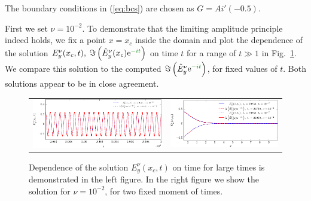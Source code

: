 The boundary conditions in (\ref{eq:bcs}) are chosen as $G=Ai'(-0.5)$. 

First we set $\nu=10^{-2}$. To demonstrate that the limiting amplitude principle indeed holds, we fix a point $x=x_c$ 
inside the domain and plot the dependence of the solution $E_{y}^{\nu}(x_c,t), \; \Im\left(\hat{E}_y^{\nu}(x_c)\mathrm{e}^{\mrev{-it}}\right)$ 
on time $t$ for a range of $t\gg 1$ in Fig.~\ref{fig:nu1e2_harmon}. We compare this solution to the computed $\Im\left(\hat{E}_y^{\nu}\mathrm{e}^{\mrev{-it}}\right)$, for
fixed values of $t$. Both solutions appear to be in close agreement. 

\begin{figure}[htb]
\begin{tabular}{cc}
\includegraphics[height=0.2\textwidth]{pics_time_domain/airy/figure_nu1e2-crop.pdf} & \includegraphics[height=0.2\textwidth]{pics_time_domain/airy/figure_nu1e2_2-crop.pdf}
\end{tabular}
\caption{Dependence of the solution $E_{y}^{\nu}(x_c,t)$  on time for large times is demonstrated in the left figure.  
In the right figure we show the solution  for $\nu=10^{-2}$, for two fixed moment of times.}
 \label{fig:nu1e2_harmon}
\end{figure}



